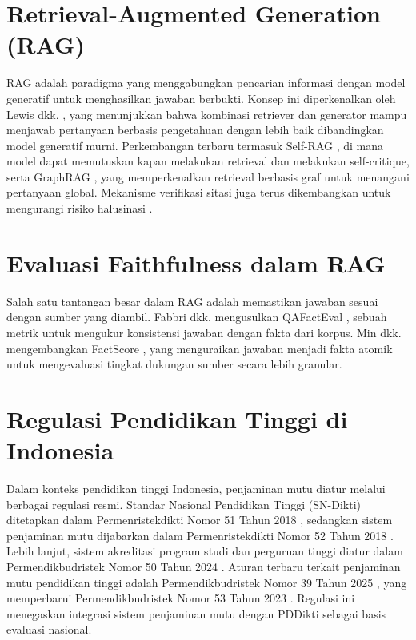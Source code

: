 \documentclass[12pt,a4paper,oneside]{report}
\begin{document}
    \section{Retrieval-Augmented Generation (RAG)}
        RAG adalah paradigma yang menggabungkan pencarian informasi dengan model generatif untuk menghasilkan jawaban berbukti. Konsep ini diperkenalkan oleh Lewis dkk. \cite{lewis2020rag}, yang menunjukkan bahwa kombinasi retriever dan generator mampu menjawab pertanyaan berbasis pengetahuan dengan lebih baik dibandingkan model generatif murni.  
        Perkembangan terbaru termasuk Self-RAG \cite{sun2023selfrag}, di mana model dapat memutuskan kapan melakukan retrieval dan melakukan self-critique, serta GraphRAG \cite{microsoft2024graphrag}, yang memperkenalkan retrieval berbasis graf untuk menangani pertanyaan global. Mekanisme verifikasi sitasi juga terus dikembangkan untuk mengurangi risiko halusinasi \cite{zhang2022citation}.

    \section{Evaluasi Faithfulness dalam RAG}
        Salah satu tantangan besar dalam RAG adalah memastikan jawaban sesuai dengan sumber yang diambil. Fabbri dkk. mengusulkan QAFactEval \cite{fabbri2021qafacteval}, sebuah metrik untuk mengukur konsistensi jawaban dengan fakta dari korpus. Min dkk. mengembangkan FactScore \cite{min2023factscore}, yang menguraikan jawaban menjadi fakta atomik untuk mengevaluasi tingkat dukungan sumber secara lebih granular.  

    \section{Regulasi Pendidikan Tinggi di Indonesia}
        Dalam konteks pendidikan tinggi Indonesia, penjaminan mutu diatur melalui berbagai regulasi resmi. Standar Nasional Pendidikan Tinggi (SN-Dikti) ditetapkan dalam Permenristekdikti Nomor 51 Tahun 2018 \cite{permenristekdikti51_2018}, sedangkan sistem penjaminan mutu dijabarkan dalam Permenristekdikti Nomor 52 Tahun 2018 \cite{permenristekdikti52_2018}.  
        Lebih lanjut, sistem akreditasi program studi dan perguruan tinggi diatur dalam Permendikbudristek Nomor 50 Tahun 2024 \cite{permendikbudristek50_2024}. Aturan terbaru terkait penjaminan mutu pendidikan tinggi adalah Permendikbudristek Nomor 39 Tahun 2025 \cite{permendikbudristek39_2025}, yang memperbarui Permendikbudristek Nomor 53 Tahun 2023 \cite{permendikbudristek53_2023}. Regulasi ini menegaskan integrasi sistem penjaminan mutu dengan PDDikti sebagai basis evaluasi nasional.  
    
\end{document}
